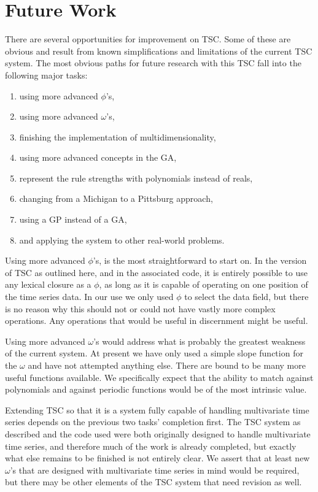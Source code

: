 \section{Future Work}
There are several opportunities for improvement on TSC.
Some of these are obvious and result from known simplifications and limitations of the current TSC system.
The most obvious paths for future research with this TSC fall into the following major tasks:
\begin{enumerate}
\item using more advanced $\phi$'s,
\item using more advanced $\omega$'s,
\item finishing the implementation of multidimensionality,
\item using more advanced concepts in the GA,
\item represent the rule strengths with polynomials instead of reals,
\item changing from a Michigan to a Pittsburg approach,
\item using a GP instead of a GA,
\item and applying the system to other real-world problems.
\end{enumerate}

Using more advanced $\phi$'s, is the most straightforward to start on.
In the version of TSC as outlined here, and in the associated code, it is entirely possible to use any lexical closure as a $\phi$, as long as it is capable of operating on one position of the time series data.
In our use we only used $\phi$ to select the data field, but there is no reason why this should not or could not have vastly more complex operations.
Any operations that would be useful in discernment might be useful.

Using more advanced $\omega$'s would address what is probably the greatest weakness of the current system.
At present we have only used a simple slope function for the $\omega$ and have not attempted anything else.
There are bound to be many more useful functions available.
We specifically expect that the ability to match against polynomials and against periodic functions would be of the most intrinsic value.

Extending TSC so that it is a system fully capable of handling multivariate time series depends on the previous two tasks' completion first.
The TSC system as described and the code used were both originally designed to handle multivariate time series, and therefore much of the work is already completed, but exactly what else remains to be finished is not entirely clear.
We assert that at least new $\omega$'s that are designed with multivariate time series in mind would be required, but there may be other elements of the TSC system that need revision as well.

